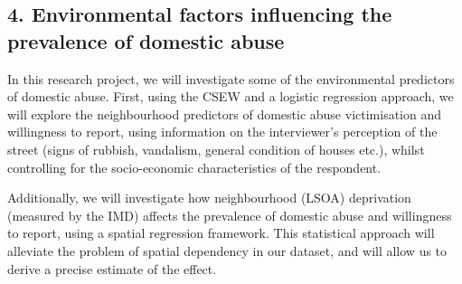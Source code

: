 \documentclass[11pt, a4paper]{article}
\begin{document}
\subsection*{4. Environmental factors influencing the prevalence of domestic abuse}

In this research project, we will investigate some of the environmental predictors of domestic abuse. First, using the CSEW and a logistic regression approach, we will explore the neighbourhood predictors of domestic abuse victimisation and willingness to report, using information on the interviewer's perception of the street (signs of rubbish, vandalism, general condition of houses etc.), whilst controlling for the socio-economic characteristics of the respondent. 

Additionally, we will investigate how neighbourhood (LSOA) deprivation (measured by the IMD) affects the prevalence of domestic abuse and willingness to report, using a spatial regression framework. This statistical approach will alleviate the problem of spatial dependency in our dataset, and will allow us to derive a precise estimate of the effect. 



%
%
%
%
%
\end{document}
